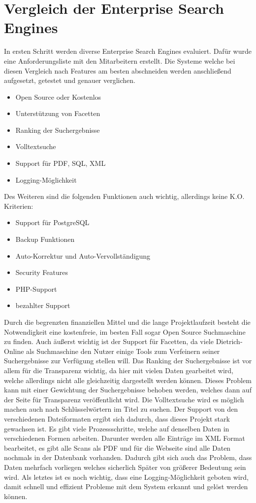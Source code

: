 \chapter{Vergleich der Enterprise Search Engines}

In ersten Schritt werden diverse Enterprise Search Engines evaluiert. Dafür wurde eine Anforderungsliste mit den Mitarbeitern erstellt. Die Systeme welche bei diesen Vergleich nach Features am besten abschneiden werden anschließend aufgesetzt, getestet und genauer verglichen.

\begin{itemize}
    \item Open Source oder Kostenlos
    \item Unterstützung von Facetten
    \item Ranking der Suchergebnisse
    \item Volltextsuche
    \item Support für PDF, SQL, XML
    \item Logging-Möglichkeit
\end{itemize}

Des Weiteren sind die folgenden Funktionen auch wichtig, allerdings keine K.O. Kriterien:

\begin{itemize}
    \item Support für PostgreSQL
    \item Backup Funktionen
    \item Auto-Korrektur und Auto-Vervollständigung
    \item Security Features
    \item PHP-Support
    \item bezahlter Support
\end{itemize}

Durch die begrenzten finanziellen Mittel und die lange Projektlaufzeit besteht die Notwendigkeit eine kostenfreie, im besten Fall sogar Open Source Suchmaschine zu finden. Auch äußerst wichtig ist der Support für Facetten, da viele Dietrich-Online als Suchmaschine den Nutzer einige Tools zum Verfeinern seiner Suchergebnisse zur Verfügung stellen will. Das Ranking der Suchergebnisse ist vor allem für die Transparenz wichtig, da hier mit vielen Daten gearbeitet wird, welche allerdings nicht alle gleichzeitig dargestellt werden können. Dieses Problem kann mit einer Gewichtung der Suchergebnisse behoben werden, welches dann auf der Seite für Transparenz veröffentlicht wird. Die Volltextsuche wird es möglich machen auch nach Schlüsselwörtern im Titel zu suchen. Der Support von den verschiedenen Dateiformaten ergibt sich dadurch, dass dieses Projekt stark gewachsen ist. Es gibt viele Prozessschritte, welche auf denselben Daten in verschiedenen Formen arbeiten. Darunter werden alle Einträge im XML Format bearbeitet, es gibt alle Scans als PDF und für die Webseite sind alle Daten nochmals in der Datenbank vorhanden. Dadurch gibt sich auch das Problem, dass Daten mehrfach vorliegen welches sicherlich Später von größerer Bedeutung sein wird. Als letztes ist es noch wichtig, dass eine Logging-Möglichkeit geboten wird, damit schnell und effizient Probleme mit dem System erkannt und gelöst werden können.

